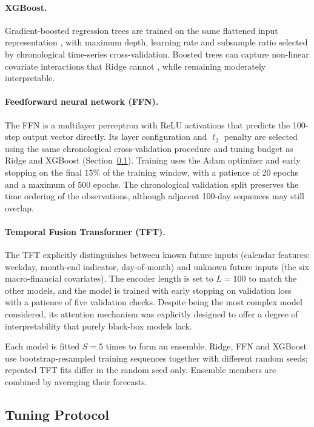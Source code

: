 \documentclass[11pt,a4paper]{article}
\begin{document}
\paragraph{XGBoost.}
Gradient-boosted regression trees are trained on the same flattened input
representation \citep{chen2016}, with maximum depth, learning rate and
subsample ratio selected by chronological time-series cross-validation.
Boosted trees can capture non-linear covariate interactions that Ridge cannot
\citep[Ch.~10]{hastie2009}, while remaining moderately interpretable.

\paragraph{Feedforward neural network (FFN).}
The FFN is a multilayer perceptron with ReLU activations that predicts the
100-step output vector directly. Its layer configuration and $\ell_2$
penalty are selected using the same chronological cross-validation procedure
and tuning budget as Ridge and XGBoost
(Section~\ref{subsec:tuning}). Training uses the Adam optimizer and early
stopping on the final $15\%$ of the training window, with a patience of
20 epochs and a maximum of 500 epochs. The chronological validation split
preserves the time ordering of the observations, although adjacent 100-day
sequences may still overlap.

\paragraph{Temporal Fusion Transformer (TFT).}
The TFT explicitly
distinguishes between known future inputs (calendar features: weekday, month-end indicator,
day-of-month) and unknown future inputs (the six macro-financial covariates). The encoder length is set to $L=100$ to match
the other models, and the model is trained with early stopping on validation
loss with a patience of five validation checks. Despite being the most complex
model considered, its attention mechanism was explicitly designed to offer a
degree of interpretability that purely black-box models lack.

\medskip
Each model is fitted \(S=5\) times to form an ensemble. Ridge, FFN and XGBoost
use bootstrap-resampled training sequences together with different random
seeds; repeated TFT fits differ in the random seed only. Ensemble members are
combined by averaging their forecasts.

\subsection{Tuning Protocol}
\label{subsec:tuning}
\end{document}
